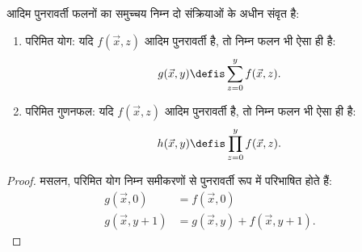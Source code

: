 \documentclass[../../../include/open-logic-section]{subfiles}
\begin{document}
\begin{prop}
आदिम पुनरावर्ती फलनों का समुच्चय निम्न दो संक्रियाओं के अधीन संवृत है:
\begin{enumerate}
\item परिमित योग: यदि $f(\vec x, z)$ आदिम पुनरावर्ती है, तो निम्न फलन
भी ऐसा ही है:
\[
g(\vec x, y) \defis \sum_{z = 0}^y f(\vec x, z).
\]
\item परिमित गुणनफल: यदि $f(\vec x, z)$ आदिम पुनरावर्ती है, तो निम्न
फलन भी ऐसा ही है:
\[
h(\vec x, y) \defis \prod_{z = 0}^y f(\vec x, z).
\]
\end{enumerate}
\end{prop}

\begin{proof}
मसलन, परिमित योग निम्न समीकरणों से पुनरावर्ती रूप में परिभाषित होते हैं:
\begin{align*}
  g(\vec x, 0) & = f(\vec x, 0)\\
  g(\vec x, y+1) & = g(\vec x, y) + f(\vec x, y+1).
\end{align*}
\end{proof}
\end{document}
